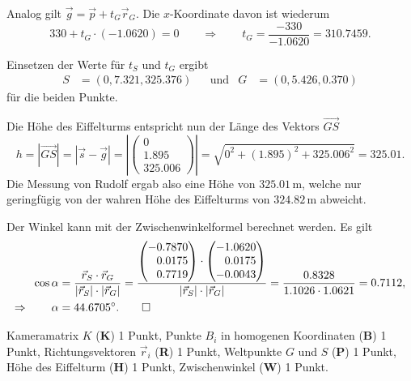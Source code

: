 \begin{loesung}
\begin{teilaufgaben}
Analog gilt $\vec g = \vec {p} + t_G\vec{r}_G$.
Die $x$-Koordinate davon ist wiederum
\[
330 + t_G\cdot (-1.0620) = 0
\qquad\Rightarrow\qquad
t_G = \frac{-330}{-1.0620}=310.7459.
\]

Einsetzen der Werte für $t_S$ und $t_G$ ergibt
\[
\begin{aligned}
S&=(0, 7.321, 325.376)
&&\text{und}&
G&=(0, 5.426, 0.370)
\end{aligned}
\]
für die beiden Punkte. 

Die Höhe des Eiffelturms entspricht nun der Länge des Vektors $\overrightarrow{GS}$
\[
  h = |\overrightarrow{GS}| = |\vec s - \vec g| = 
\left|\begin{pmatrix}
0\\
1.895\\
325.006
\end{pmatrix}\right| = \sqrt{0^2 + (1.895)^2 + 325.006^2} = 325.01.
\]
Die Messung von Rudolf ergab also eine Höhe von $325.01\,$m, welche nur geringfügig 
von der wahren Höhe des Eiffelturms von $324.82\,$m abweicht.
\item
Der Winkel kann mit der Zwischenwinkelformel berechnet werden.
Es gilt
\begin{align*}
\cos\alpha
&=
\frac{\vec r_S\cdot\vec r_G}{|\vec r_S|\cdot|\vec r_G|}
=
\frac{\begin{pmatrix}
-0.7870 \\
\phantom{-}0.0175 \\
\phantom{-}0.7719
\end{pmatrix}
\cdot\begin{pmatrix}
-1.0620 \\
\phantom{-}0.0175 \\
-0.0043
\end{pmatrix}}
{|\vec r_S|\cdot|\vec r_G|}
=
\frac{0.8328}{1.1026\cdot 1.0621} = 0.7112,
\\
\Rightarrow\qquad
\alpha
&=
44.6705^\circ.
\qedhere
\end{align*}
\end{teilaufgaben}
\end{loesung}

\begin{bewertung}
Kameramatrix $K$ ({\bf K}) 1 Punkt,
Punkte $B_i$ in homogenen Koordinaten ({\bf B}) 1 Punkt,
Richtungsvektoren $\vec{r}_i$ ({\bf R}) 1 Punkt,
Weltpunkte $G$ und $S$ ({\bf P}) 1 Punkt,
Höhe des Eiffelturm ({\bf H}) 1 Punkt,
Zwischenwinkel ({\bf W}) 1 Punkt.
\end{bewertung}
